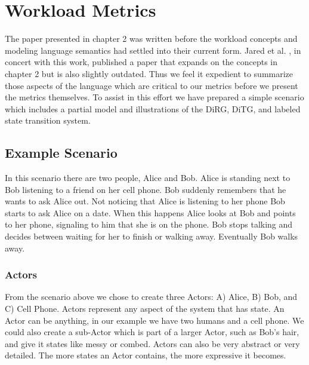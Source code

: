 \chapter{Workload Metrics} \label{ch:workload}
The paper presented in chapter 2 was written before the workload concepts and modeling language semantics had settled into their current form.  Jared et al. \cite{moore2014modeling}, in concert with this work, published a paper that expands on the concepts in chapter 2 but is also slightly outdated.  Thus we feel it expedient to summarize those aspects of the language which are critical to our metrics before we present the metrics themselves.  To assist in this effort we have prepared a simple scenario which includes a partial model and illustrations of the DiRG, DiTG, and labeled state transition system.

\section{Example Scenario}
In this scenario there are two people, Alice and Bob.  Alice is standing next to Bob listening to a friend on her cell phone.  Bob suddenly remembers that he wants to ask Alice out.  Not noticing that Alice is listening to her phone Bob starts to ask Alice on a date.  When this happens Alice looks at Bob and points to her phone, signaling to him that she is on the phone.  Bob stops talking and decides between waiting for her to finish or walking away.  Eventually Bob walks away.

\subsection{Actors}
From the scenario above we chose to create three Actors: A) Alice, B) Bob, and C) Cell Phone.  Actors represent any aspect of the system that has state.  An Actor can be anything, in our example we have two humans and a cell phone.  We could also create a sub-Actor which is part of a larger Actor, such as Bob's hair, and give it states like messy or combed.  Actors can also be very abstract or very detailed.  The more states an Actor contains, the more expressive it becomes.

